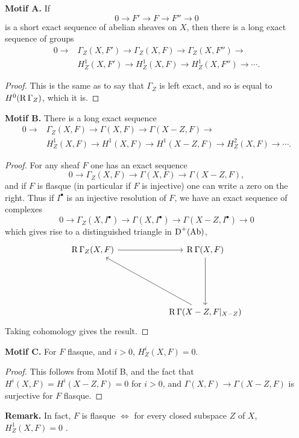 \medskip\noindent\textbf{Motif A.} If
\[
0\longrightarrow F'\longrightarrow F\longrightarrow F''\longrightarrow 0
\]
is a short exact sequence of abelian sheaves on $X$, then there is a long exact sequence of groups
\begin{align*}
0\longrightarrow &\Gamma_Z(X,F')\longrightarrow \Gamma_Z(X,F)\longrightarrow \Gamma_Z(X,F'')\longrightarrow\\
&H^1_Z(X,F')\longrightarrow H^1_Z(X,F)\longrightarrow H^1_Z(X,F'')\longrightarrow\cdots.
\end{align*}
\begin{proof}
This is the same as to say that $\Gamma_Z$ is left exact, and so is equal to $H^0(\operatorname{R}\Gamma_Z)$, which it is.
\end{proof}

\medskip\noindent\textbf{Motif B.} There is a long exact sequence
\begin{align*}
0\longrightarrow& \Gamma_Z(X,F)\longrightarrow \Gamma(X,F)\longrightarrow \Gamma(X-Z,F)\longrightarrow\\
&H^1_Z(X,F)\longrightarrow H^1(X,F)\longrightarrow H^1(X-Z,F)\longrightarrow H^2_Z(X,F)\longrightarrow\cdots.
\end{align*}
\begin{proof}
For any sheaf $F$ one has an exact sequence
\[
0\longrightarrow \Gamma_Z(X,F)\longrightarrow \Gamma(X,F)\longrightarrow \Gamma(X-Z,F),
\]
and if $F$ is flasque (in particular if $F$ is injective) one can write a zero on the right. Thus if $I^\bullet$ is an injective resolution of $F$, we have an exact sequence of complexes
\[
0\longrightarrow \Gamma_Z(X,I^\bullet)\longrightarrow \Gamma(X,I^\bullet)\longrightarrow \Gamma(X-Z,I^\bullet)\longrightarrow 0
\]
which gives rise to a distinguished triangle in $\operatorname{D}^+(\operatorname{Ab})$,
\[
\begin{tikzcd}[row sep=2cm, column sep=2cm]
	\RR\Gamma_Z(X,F) \arrow[r]& \RR\Gamma(X,F) \arrow[d] \\
	& \RR\Gamma(X-Z,F|_{X-Z}) \arrow[lu]
\end{tikzcd}
\]
Taking cohomology gives the result.
\end{proof}

\medskip\noindent\textbf{Motif C.} For $F$ flasque, and $i>0$, $H_Z^i(X,F)=0$.
\begin{proof}
This follows from Motif B, and the fact that $H^i(X,F)=H^i(X-Z,F)=0$ for $i>0$, and $\Gamma(X,F)\to\Gamma(X-Z,F)$ is surjective for $F$ flasque.
\end{proof}
\par\medskip\noindent\textbf{Remark.}
In fact, $F$ is flasque $\iff$ for every closed subspace $Z$ of $X$, $H_Z^1(X,F)=0$ \cite[]{LC}.
\par\medskip

